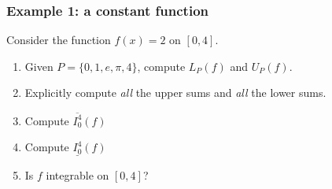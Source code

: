 \begin{frame}[t]
	\fontsize{13}{13}\selectfont
	\frametitle{Example 1: a constant function}

	Consider the function \; $f(x)=2$ \; on \; $[0,4]$.
	\vspace{.2cm}

	\begin{enumerate}
		\item Given $\displaystyle P =\{ 0, 1, e, \pi, 4 \}$, compute
			$\displaystyle L_{P}(f)$ and $\displaystyle U_{P}(f)$.

		\item Explicitly compute \emph{all} the upper sums and \emph{all} the lower sums.
			\vspace{.2cm}

		\item Compute $\displaystyle \overline{I_0^4}(f)$
			\vspace{.2cm}

		\item Compute $\displaystyle \underline{I_0^4}(f)$
			\vspace{.2cm}

		\item Is $f$ integrable on $[0,4]$?
	\end{enumerate}
\end{frame}

